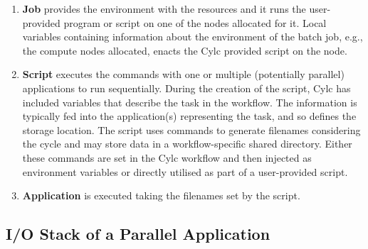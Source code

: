 \documentclass{superfri}
\begin{document}
\begin{enumerate}
  \item \textbf{Job} provides the environment with the resources and it runs the user-provided program or script on one of the nodes allocated for it.
  Local variables containing information about the environment of the batch job, e.g., the compute nodes allocated, enacts the Cylc provided script on the node.

  \item \textbf{Script} executes the commands with one or multiple (potentially parallel) applications to run sequentially.
  During the creation of the script, Cylc has included variables that describe the task in the workflow.
  The information is typically fed into the application(s) representing the task, and so defines the storage location.
  The script uses commands to generate filenames considering the cycle and may store data in a workflow-specific shared directory.
  Either these commands are set in the Cylc workflow and then injected as environment variables or directly utilised as part of a user-provided script.

  \item \textbf{Application} is executed taking the filenames set by the script.
\end{enumerate}

\subsection{I/O Stack of a Parallel Application}

\end{document}

